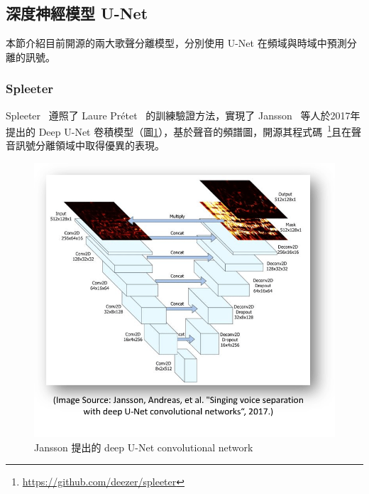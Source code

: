 \subsection{深度神經模型 U-Net}
本節介紹目前開源的兩大歌聲分離模型，分別使用 U-Net 在頻域與時域中預測分離的訊號。

\subsubsection{Spleeter}
Spleeter~\cite{hennequin2020spleeter} 遵照了 Laure Prétet ~\cite{pretet2019singing}的訓練驗證方法，實現了 Jansson~\cite{jansson2017singing} 等人於2017年提出的 Deep U-Net 卷積模型（圖\ref{spleeter1}），基於聲音的頻譜圖，開源其程式碼~\footnote{\url{https://github.com/deezer/spleeter}}且在聲音訊號分離領域中取得優異的表現。

\begin{figure}[htbp]
    \hfil
    \begin{minipage}[t]{0.55\textwidth}
        \includegraphics[width=\textwidth]{./figures/chapter02_method/spleeter1.png}
        \caption {Jansson 提出的 deep U-Net convolutional network}
        \label{spleeter1}
    \end{minipage}
    \hfil
\end{figure}

